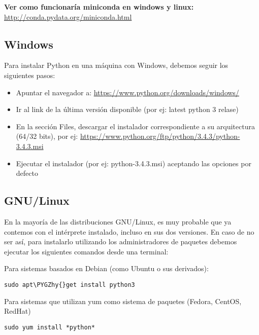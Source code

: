 \documentclass[a4paper,12pt,spanish]{sphinxmanual}
\def\PYGZhy{\char`\-}
\begin{document}
\textbf{Ver como funcionaría miniconda en windows y linux:}
\href{http://conda.pydata.org/miniconda.html}{http://conda.pydata.org/miniconda.html}


\subsection{Windows}
\label{Unidad01:windows}
Para instalar Python en una máquina con Windows, debemos seguir los
siguientes pasos:
\begin{itemize}
\item {} 
Apuntar el navegador a: \href{https://www.python.org/downloads/windows/}{https://www.python.org/downloads/windows/}

\item {} 
Ir al link de la última versión disponible (por ej: latest python 3
relase)

\item {} 
En la sección Files, descargar el instalador correspondiente a su
arquitectura (64/32 bits), por ej:
\href{https://www.python.org/ftp/python/3.4.3/python-3.4.3.msi}{https://www.python.org/ftp/python/3.4.3/python-3.4.3.msi}

\item {} 
Ejecutar el instalador (por ej: python-3.4.3.msi) aceptando las
opciones por defecto

\end{itemize}


\subsection{GNU/Linux}
\label{Unidad01:gnu-linux}
En la mayoría de las distribuciones GNU/Linux, es muy probable que ya
contemos con el intérprete instalado, incluso en sus dos versiones. En
caso de no ser así, para instalarlo utilizando los administradores de
paquetes debemos ejecutar los siguientes comandos desde una terminal:

Para sistemas basados en Debian (como Ubuntu o sus derivados):

\begin{Verbatim}[commandchars=\\\{\}]
sudo apt\PYGZhy{}get install python3
\end{Verbatim}

Para sistemas que utilizan yum como sistema de paquetes (Fedora, CentOS,
RedHat)

\begin{Verbatim}[commandchars=\\\{\}]
sudo yum install *python*
\end{Verbatim}
\end{document}
